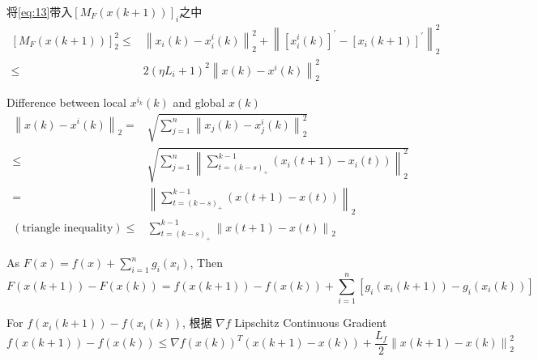 \documentclass{ctexart}
\begin{document}
将\ref{eq:13}带入$ \left[ M_F \left(x\left(k+1\right)\right) \right]_i $之中
\begin{align}\label{eq:14}
  \left[ M_F \left(x\left(k+1\right)\right) \right]_2^2 \leq & \left\| x_i \left(k\right) - x_i^i \left(k\right) \right\|_2^2 + \left\| \left[x_i^i \left(k\right)\right]^{'} - \left[ x_i \left(k+1\right) \right]^{'} \right\|_2^2 \nonumber \\
  \leq & 2\left( \eta L_i +1 \right)^2\left\| x\left(k\right) - x^{i} \left(k\right)\right\|_2^2
\end{align}

Difference between local $x^{i_k}\left(k\right)$ and global $x\left(k\right)$
\begin{align}\label{eq:15}
  \left\| x\left( k \right) - x^{i}\left(k\right) \right\|_2 = & \sqrt{\sum\limits_{j=1}^{n} \left\| x_j \left(k\right) - x_j^i\left(k\right) \right\|_2^2} \nonumber \\
  \leq & \sqrt{\sum\limits_{j=1}^{n} \left\| \sum\limits_{t = \left( k-s \right)_+ }^{k-1}\left( x_i \left( t+1 \right) - x_i \left( t \right) \right) \right\|_2^2} \nonumber\\
  = & \left\| \sum\limits_{t = \left( k-s \right)_+ }^{k-1} \left( x\left( t+1 \right) - x\left(t\right) \right) \right\|_2 \nonumber \\
  \left(\text{triangle inequality}\right)\leq & \sum\limits_{t = \left( k-s \right)_+}^{k-1} \left\| x\left( t+1 \right) - x\left(t\right)\right\|_2
\end{align}

As $ F\left(x\right) =f\left(x\right) + \sum\limits_{i=1}^{n} g_i \left( x_i \right) $, Then
\begin{equation}\label{eq:16}
  F\left( x\left(k+1\right) \right) - F\left( x\left(k\right) \right) = f\left( x\left(k+1\right) \right) - f\left( x\left(k\right) \right) + \sum\limits_{i=1}^{n}\left[ g_i \left( x_i \left( k+1 \right) \right) - g_i \left( x_i
\left(k\right)\right) \right]
\end{equation}

For $ f\left( x_i \left( k+1 \right) \right) - f\left( x_i \left(k\right) \right) $, 根据 $ \nabla f $ Lipschitz Continuous Gradient
\begin{equation}\label{eq:17}
  f\left(x\left(k+1\right)\right) - f\left(x\left(k\right)\right) \leq \nabla f\left(x\left(k\right)\right)^T \left( x\left(k+1\right) -x\left(k\right) \right) + \frac{L_f}{2}\left\| x\left(k+1\right) - x\left(k\right) \right\|_2^2
\end{equation}
\end{document}

